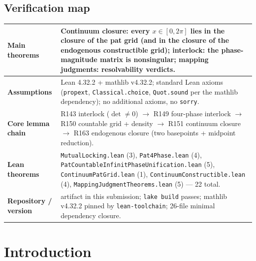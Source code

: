 \documentclass[sigplan,10pt,anonymous,review]{acmart}
\begin{document}

\maketitle

\subsection*{Verification map}

\begin{center}
\small
\begin{tabular}{@{}p{}p{}@{}}
\toprule
\textbf{Main theorems} &
Continuum closure: every $x \in [0, 2\pi]$ lies in the closure of the
pat grid (and in the closure of the endogenous constructible grid);
interlock: the phase-magnitude matrix is nonsingular; mapping
judgments: resolvability verdicts. \\
\midrule
\textbf{Assumptions} &
Lean 4.32.2 + mathlib v4.32.2; standard Lean axioms
(\texttt{propext}, \texttt{Classical.choice}, \texttt{Quot.sound}
per the mathlib dependency); no additional axioms, no
\texttt{sorry}. \\
\midrule
\textbf{Core lemma chain} &
R143 interlock ($\det \neq 0$) $\to$ R149 four-phase interlock $\to$
R150 countable grid + density $\to$ R151 continuum closure $\to$
R163 endogenous closure (two basepoints + midpoint reduction). \\
\midrule
\textbf{Lean theorems} &
\texttt{MutualLocking.lean} (3), \texttt{Pat4Phase.lean} (4),
\texttt{PatCountableInfinitPhaseUnification.lean} (5),
\texttt{ContinuumPatGrid.lean} (1),
\texttt{ContinuumConstructible.lean} (4),
\texttt{MappingJudgmentTheorems.lean} (5) --- 22 total. \\
\midrule
\textbf{Repository / version} &
artifact in this submission; \texttt{lake build} passes; mathlib
v4.32.2 pinned by \texttt{lean-toolchain}; 26-file minimal dependency
closure. \\
\bottomrule
\end{tabular}
\end{center}

\section{Introduction}
\end{document}
